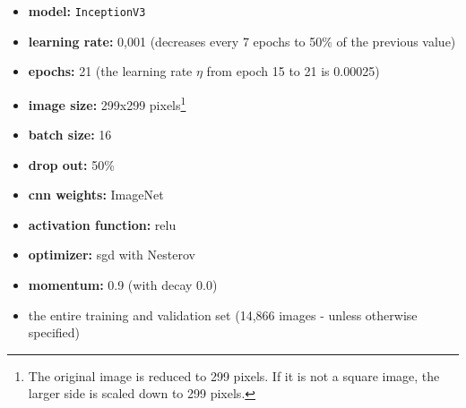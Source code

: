 \documentclass[10pt]{article}
\newif\ifen
\newif\ifde
\newcommand{\en}[1]{\ifen#1\fi}
\newcommand{\de}[1]{\ifde#1\fi}
\begin{document}
					\begin{itemize}
						\setlength\itemsep{0em}
						\item \textbf{model:} \texttt{InceptionV3}
						\item \textbf{learning rate:} 0,001 (decreases every 7 epochs to 50\% of the previous value)
						\item \textbf{epochs:} 21 (the learning rate \(\eta\) from epoch 15 to 21 is 0.00025)
						\item \textbf{image size:} 299x299 pixels\footnote{The original image is reduced to 299 pixels. If it is not a square image, the larger side is scaled down to 299 pixels.}
						\item \textbf{batch size:} 16
						\item \textbf{drop out:} 50\%
						\item \textbf{\ac{cnn} weights:} ImageNet
						\item \textbf{activation function:} \ac{relu}
						\item \textbf{optimizer:} \ac{sgd} with Nesterov
						\item \textbf{momentum:} 0.9 (with decay 0.0)
						\item the entire training and validation set (14,866 images - unless otherwise specified)
					\end{itemize}
					
				\de{\noindent Verschiedene Modelle wurden im Kapitel ``\nameref{sec:section_validation_compare_cnn_models}'' mit den gleichen Parametern wie oben ausprobiert: \texttt{DenseNet121}, \texttt{DenseNet201}, \texttt{InceptionResNetV2}, \texttt{InceptionV3}, \texttt{NASNetLarge}, \texttt{ResNet50}, \texttt{VGG19} und \texttt{Xception}}
				\en{\noindent Different models were tried out in chapter ``\nameref{sec:section_validation_comparison_cnn_models}'' with the same parameters as above: \texttt{DenseNet121}, \texttt{DenseNet201}, \texttt{InceptionResNetV2}, \texttt{InceptionV3}, \texttt{NASNetLarge}, \texttt{ResNet50}, \texttt{VGG19} and \texttt{Xception}}

	\pagebreak
\end{document}
